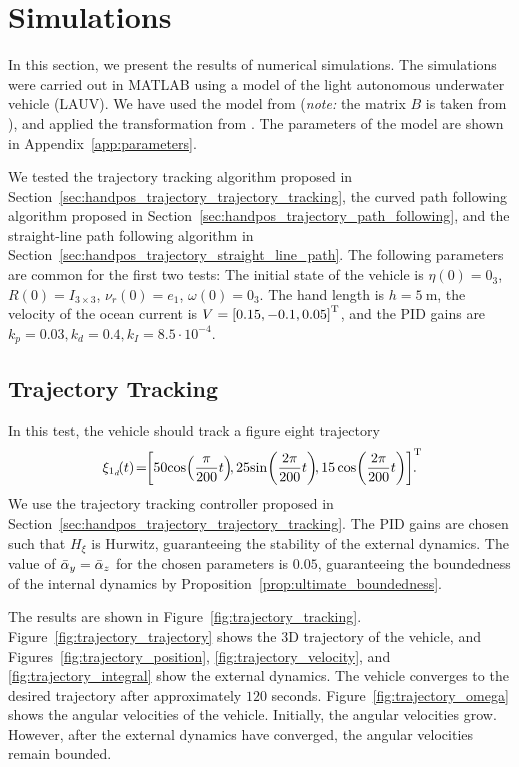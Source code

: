 \section{Simulations}
\label{sec:handpos_trajectory_simulations}


In this section, we present the results of numerical simulations.
The simulations were carried out in MATLAB using a model of the light autonomous underwater vehicle (LAUV).
We have used the model from \cite{da_silva_2007_modeling} (\emph{note:} the matrix $B$ is taken from \cite[Appendix B.3]{caharija_ILOS_2014}), and applied the transformation from \cite{borhaug_straight_2007}.
The parameters of the model are shown in Appendix~\ref{app:parameters}.

We tested the trajectory tracking algorithm proposed in Section~\ref{sec:handpos_trajectory_trajectory_tracking}, the curved path following algorithm proposed in Section~\ref{sec:handpos_trajectory_path_following}, and the straight-line path following algorithm in Section~\ref{sec:handpos_trajectory_straight_line_path}.
The following parameters are common for the first two tests:
The initial state of the vehicle is $\eta(0) = 0_3$, $R(0) = I_{3 \times 3}$, $\nu_r(0) = e_1$, $\omega(0) = 0_3$.
The hand length is $h = \SI{5}{\meter}$, the velocity of the ocean current is $V = \left[0.15, -0.1, 0.05\right]^{\mathrm{T}}$, and the PID gains are $k_p = 0.03, k_d = 0.4, k_I = 8.5 \cdot 10^{-4}$.

\subsection{Trajectory Tracking}

In this test, the vehicle should track a figure eight trajectory
\begin{equation}
    \xi_{1_d}\!(t) \!=\!\! \inlinevector{50\!\cos\!\left(\frac{\pi}{200}t\right)\!\!, 25\!\sin\!\left(\frac{2\pi}{200}t\right)\!\!, 15\cos\!\left(\frac{2\pi}{200}t\right)}\!\!\!\!\!.
\end{equation}
We use the trajectory tracking controller proposed in Section~\ref{sec:handpos_trajectory_trajectory_tracking}.
The PID gains are chosen such that $H_{\xi}$ is Hurwitz, guaranteeing the stability of the external dynamics.
The value of $\Bar{\alpha}_y = \Bar{\alpha}_z$ for the chosen parameters is $0.05$, guaranteeing the boundedness of the internal dynamics by Proposition~\ref{prop:ultimate_boundedness}.

The results are shown in Figure~\ref{fig:trajectory_tracking}.
Figure~\ref{fig:trajectory_trajectory} shows the 3D trajectory of the vehicle, and Figures~\ref{fig:trajectory_position}, \ref{fig:trajectory_velocity}, and \ref{fig:trajectory_integral} show the external dynamics.
The vehicle converges to the desired trajectory after approximately $120$ seconds.
Figure~\ref{fig:trajectory_omega} shows the angular velocities of the vehicle.
Initially, the angular velocities grow.
However, after the external dynamics have converged, the angular velocities remain bounded.

